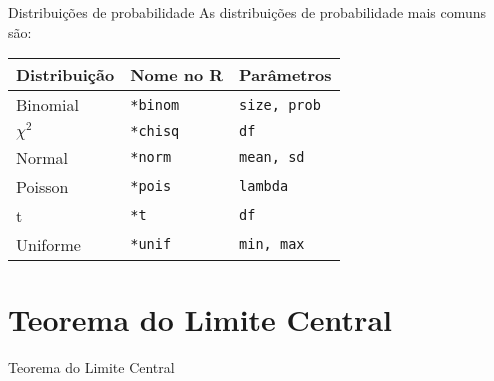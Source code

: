 \documentclass[10pt]{beamer}\usepackage{graphicx, color}
\providecommand{\R}{\textsf{R}\xspace}
\begin{document}
\begin{frame}[fragile=singleslide]{Distribuições de probabilidade}
As distribuições de probabilidade mais comuns são:
\begin{center}
\begin{tabular}{lll}
\hline
Distribuição & Nome no \R & Parâmetros \\
\hline
Binomial & \texttt{*binom} & \texttt{size, prob} \\
$\chi^2$ & \texttt{*chisq} & \texttt{df} \\

Normal & \texttt{*norm} & \texttt{mean, sd} \\
Poisson & \texttt{*pois} & \texttt{lambda} \\
t & \texttt{*t} & \texttt{df} \\
Uniforme & \texttt{*unif} & \texttt{min, max}\\
\hline
\end{tabular}
\end{center}
\end{frame}

\section{Teorema do Limite Central}
\label{sec:tlc}

\begin{frame}{Teorema do Limite Central}

\end{frame}
\end{document}
